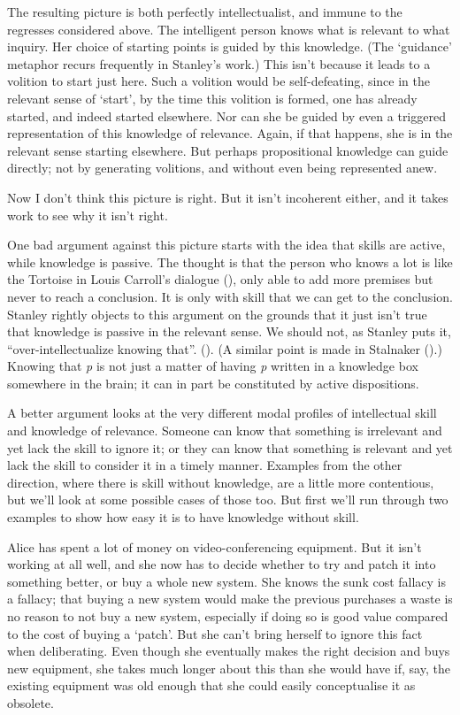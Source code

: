 \documentclass[
  10pt,
  letterpaper,
  DIV=11,
  numbers=noendperiod,
  twoside]{scrartcl}
\begin{document}
The resulting picture is both perfectly intellectualist, and immune to
the regresses considered above. The intelligent person knows what is
relevant to what inquiry. Her choice of starting points is guided by
this knowledge. (The `guidance' metaphor recurs frequently in Stanley's
work.) This isn't because it leads to a volition to start just here.
Such a volition would be self-defeating, since in the relevant sense of
`start', by the time this volition is formed, one has already started,
and indeed started elsewhere. Nor can she be guided by even a triggered
representation of this knowledge of relevance. Again, if that happens,
she is in the relevant sense starting elsewhere. But perhaps
propositional knowledge can guide directly; not by generating volitions,
and without even being represented anew.

Now I don't think this picture is right. But it isn't incoherent either,
and it takes work to see why it isn't right.

One bad argument against this picture starts with the idea that skills
are active, while knowledge is passive. The thought is that the person
who knows a lot is like the Tortoise in Louis Carroll's dialogue
(), only able to add more
premises but never to reach a conclusion. It is only with skill that we
can get to the conclusion. Stanley rightly objects to this argument on
the grounds that it just isn't true that knowledge is passive in the
relevant sense. We should not, as Stanley puts it,
``over-intellectualize knowing that''.
(). (A similar
point is made in Stalnaker ().)
Knowing that \emph{p} is not just a matter of having \emph{p} written in
a knowledge box somewhere in the brain; it can in part be constituted by
active dispositions.

A better argument looks at the very different modal profiles of
intellectual skill and knowledge of relevance. Someone can know that
something is irrelevant and yet lack the skill to ignore it; or they can
know that something is relevant and yet lack the skill to consider it in
a timely manner. Examples from the other direction, where there is skill
without knowledge, are a little more contentious, but we'll look at some
possible cases of those too. But first we'll run through two examples to
show how easy it is to have knowledge without skill.

Alice has spent a lot of money on video-conferencing equipment. But it
isn't working at all well, and she now has to decide whether to try and
patch it into something better, or buy a whole new system. She knows the
sunk cost fallacy is a fallacy; that buying a new system would make the
previous purchases a waste is no reason to not buy a new system,
especially if doing so is good value compared to the cost of buying a
`patch'. But she can't bring herself to ignore this fact when
deliberating. Even though she eventually makes the right decision and
buys new equipment, she takes much longer about this than she would have
if, say, the existing equipment was old enough that she could easily
conceptualise it as obsolete.
\end{document}

